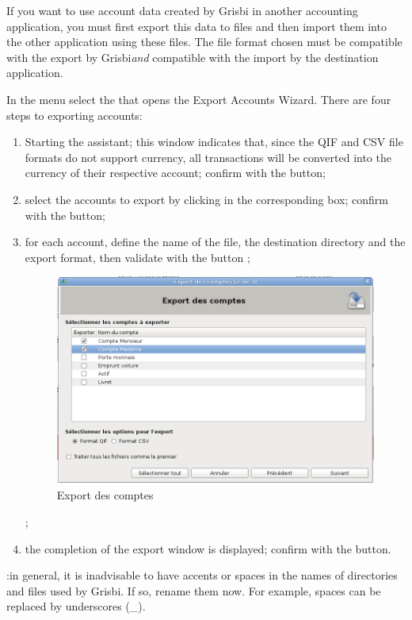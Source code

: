 If you want to use account data created by Grisbi in another accounting application, you must first export this data to files and then import them into the other application using these files. The file format chosen must be compatible with the export by Grisbi\emph{and} compatible with the import by the destination application.
 
In the  menu select the  that opens the Export Accounts Wizard. There are four steps to exporting accounts:

\begin{enumerate}
	\item Starting the assistant; this window indicates that, since the QIF and CSV file formats do not support currency, all transactions will be converted into the currency of their respective account; confirm with the  button;
	\item select the accounts to export by clicking in the corresponding box; confirm with the   button;
	\item for each account, define the name of the file, the destination directory and the export format, then validate with the  button \ifIllustration {} ;
	\begin{figure}[t]
	\begin{center}
	\includegraphics[scale=0.5]{image/screenshot/QIF_export}
	\end{center}
	\caption{Export des comptes}
	\label{QIF-export-img}
	\end{figure}
	\else  ;
	\fi
	
	\item the completion of the export window is displayed; confirm with the  button.
\end{enumerate}

 :in general, it is inadvisable to have accents or spaces in the names of directories and files used by Grisbi. If so, rename them now. For example, spaces can be replaced by underscores (\_).











